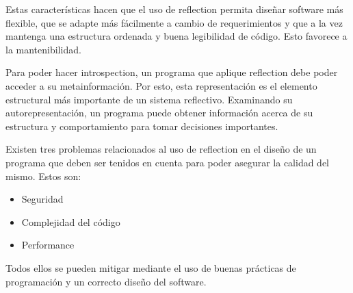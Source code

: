Estas características hacen que el uso de reflection permita diseñar software
más flexible, que se adapte más fácilmente a cambio de requerimientos y que a
la vez mantenga una estructura ordenada y buena legibilidad de código.
Esto favorece a la mantenibilidad.

Para poder hacer introspection, un programa que aplique reflection debe poder
acceder a su metainformación. Por esto, esta representación es el elemento
estructural más importante de un sistema reflectivo. Examinando su
autorepresentación, un programa puede obtener información acerca de su
estructura y comportamiento para tomar decisiones importantes.

Existen tres problemas relacionados al uso de reflection en el diseño de un
programa que deben ser tenidos en cuenta para poder asegurar la calidad del
mismo. Estos son:
\begin{itemize}
    \item Seguridad
    \item Complejidad del código
    \item Performance
\end{itemize}
Todos ellos se pueden mitigar mediante el uso de buenas prácticas de programación y un correcto diseño del software.